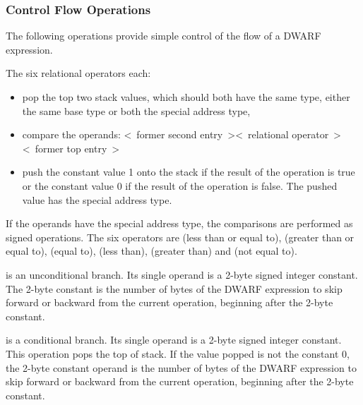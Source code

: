 \subsubsection{Control Flow Operations}
\label{chap:controlflowoperations}
The 
following operations provide simple control of the flow of a DWARF expression.
\begin{enumerate}[1. ]
\itembfnl{\DWOPleTARG, \DWOPgeTARG, \DWOPeqTARG, \DWOPltTARG, \DWOPgtTARG, \DWOPneTARG}
The six relational operators each:
\begin{itemize}
\item pop the top two stack values, which should both have the same type,
either the same base type or both the special address type, 

\item compare the operands:
\linebreak
\textless~former second entry~\textgreater  \textless~relational operator~\textgreater \textless~former top entry~\textgreater

\item push the constant value 1 onto the stack 
if the result of the operation is true or the
constant value 0 if the result of the operation is false.
The pushed value has the special address type.
\end{itemize}

If the operands have the special address type, the comparisons  
are performed as signed operations.
The six operators are \DWOPleNAME{} (less than or equal to), \DWOPgeNAME{}
(greater than or equal to), \DWOPeqNAME{} (equal to), \DWOPltNAME{} (less
than), \DWOPgtNAME{} (greater than) and \DWOPneNAME{} (not equal to).

\itembfnl{\DWOPskipTARG}
\DWOPskipNAME{} is an unconditional branch. Its single operand
is a 2-byte signed integer constant. The 2-byte constant is
the number of bytes of the DWARF expression to skip forward
or backward from the current operation, beginning after the
2-byte constant.

\itembfnl{\DWOPbraTARG}
\DWOPbraNAME{} is a conditional branch. Its single operand is a
2-byte signed integer constant.  This operation pops the
top of stack. If the value popped is not the constant 0,
the 2-byte constant operand is the number of bytes of the
DWARF expression to skip forward or backward from the current
operation, beginning after the 2-byte constant.


\end{enumerate}
